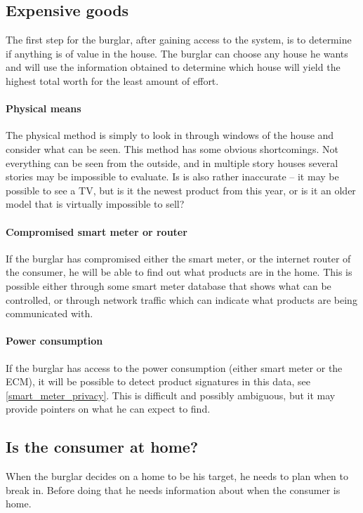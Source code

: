 \subsection{Expensive goods}
The first step for the burglar, after gaining access to the system, is to determine if anything is of value in the house. 
The burglar can choose any house he wants and will use the information obtained to determine which house will yield the highest total worth for the least amount of effort.

\paragraph{Physical means}
The physical method is simply to look in through windows of the house and consider what can be seen. 
This method has some obvious shortcomings.
Not everything can be seen from the outside, and in multiple story houses several stories may be impossible to evaluate.
Is is also rather inaccurate -- it may be possible to see a TV, but is it the newest product from this year, or is it an older model that is virtually impossible to sell?

\paragraph{Compromised smart meter or router}
If the burglar has compromised either the smart meter, or the internet router of the consumer, he will be able to find out what products are in the home. 
This is possible either through some smart meter database that shows what can be controlled, or through network traffic which can indicate what products are being communicated with.

\paragraph{Power consumption}
If the burglar has access to the power consumption (either smart meter or the ECM), it will be possible to detect product signatures in this data, see \cref{smart_meter_privacy}.
This is difficult and possibly ambiguous, but it may provide pointers on what he can expect to find.

\subsection{Is the consumer at home?}
When the burglar decides on a home to be his target, he needs to plan when to break in.
Before doing that he needs information about when the consumer is home.

